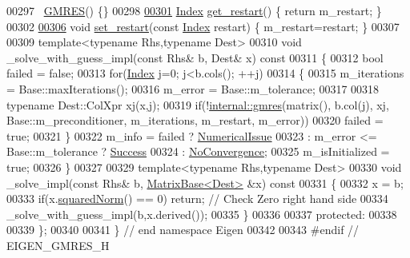 \begin{DoxyCode}
00297   ~\hyperlink{group___iterative_linear_solvers___module_class_eigen_1_1_g_m_r_e_s}{GMRES}() \{\}
00298 
\hyperlink{group___iterative_linear_solvers___module_ade721328e58ace2d4493cbdcbe53ad09}{00301}   \hyperlink{namespace_eigen_a62e77e0933482dafde8fe197d9a2cfde}{Index} \hyperlink{group___iterative_linear_solvers___module_ade721328e58ace2d4493cbdcbe53ad09}{get\_restart}() \{ \textcolor{keywordflow}{return} m\_restart; \}
00302 
\hyperlink{group___iterative_linear_solvers___module_ac50d6bbca4a8a275861770feb211900d}{00306}   \textcolor{keywordtype}{void} \hyperlink{group___iterative_linear_solvers___module_ac50d6bbca4a8a275861770feb211900d}{set\_restart}(\textcolor{keyword}{const} \hyperlink{namespace_eigen_a62e77e0933482dafde8fe197d9a2cfde}{Index} restart) \{ m\_restart=restart; \}
00307 
00309   \textcolor{keyword}{template}<\textcolor{keyword}{typename} Rhs,\textcolor{keyword}{typename} Dest>
00310   \textcolor{keywordtype}{void} \_solve\_with\_guess\_impl(\textcolor{keyword}{const} Rhs& b, Dest& x)\textcolor{keyword}{ const}
00311 \textcolor{keyword}{  }\{
00312     \textcolor{keywordtype}{bool} failed = \textcolor{keyword}{false};
00313     \textcolor{keywordflow}{for}(\hyperlink{namespace_eigen_a62e77e0933482dafde8fe197d9a2cfde}{Index} j=0; j<b.cols(); ++j)
00314     \{
00315       m\_iterations = Base::maxIterations();
00316       m\_error = Base::m\_tolerance;
00317 
00318       \textcolor{keyword}{typename} Dest::ColXpr xj(x,j);
00319       \textcolor{keywordflow}{if}(!\hyperlink{namespace_eigen_1_1internal_a851df31ae9133639a8eb3f6a8484bbf7}{internal::gmres}(matrix(), b.col(j), xj, Base::m\_preconditioner, m\_iterations, 
      m\_restart, m\_error))
00320         failed = \textcolor{keyword}{true};
00321     \}
00322     m\_info = failed ? \hyperlink{group__enums_gga85fad7b87587764e5cf6b513a9e0ee5eaaf9b736d310a664e7729d163a035cc5f}{NumericalIssue}
00323           : m\_error <= Base::m\_tolerance ? \hyperlink{group__enums_gga85fad7b87587764e5cf6b513a9e0ee5ea52581b035f4b59c203b8ff999ef5fcea}{Success}
00324           : \hyperlink{group__enums_gga85fad7b87587764e5cf6b513a9e0ee5eaba1c8763d1179778070f365ecc4157a8}{NoConvergence};
00325     m\_isInitialized = \textcolor{keyword}{true};
00326   \}
00327 
00329   \textcolor{keyword}{template}<\textcolor{keyword}{typename} Rhs,\textcolor{keyword}{typename} Dest>
00330   \textcolor{keywordtype}{void} \_solve\_impl(\textcolor{keyword}{const} Rhs& b, \hyperlink{group___core___module_class_eigen_1_1_matrix_base}{MatrixBase<Dest>} &x)\textcolor{keyword}{ const}
00331 \textcolor{keyword}{  }\{
00332     x = b;
00333     \textcolor{keywordflow}{if}(x.\hyperlink{group___core___module_a8782faeb21e43908cdce47cec06fba23}{squaredNorm}() == 0) \textcolor{keywordflow}{return}; \textcolor{comment}{// Check Zero right hand side}
00334     \_solve\_with\_guess\_impl(b,x.derived());
00335   \}
00336 
00337 \textcolor{keyword}{protected}:
00338 
00339 \};
00340 
00341 \} \textcolor{comment}{// end namespace Eigen}
00342 
00343 \textcolor{preprocessor}{#endif // EIGEN\_GMRES\_H}
\end{DoxyCode}
